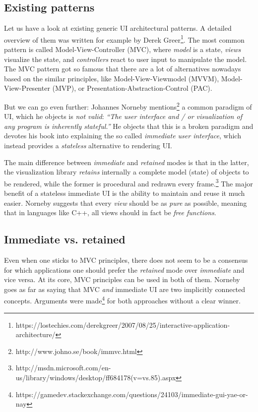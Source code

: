 \subsection{Existing patterns}

Let us have a look at existing generic UI architectural patterns.
A detailed overview of them was written for example by Derek Greer\footnote{https://lostechies.com/derekgreer/2007/08/25/interactive-application-architecture/}.
The most common pattern is called Model-View-Controller (MVC), where \emph{model} is a state, \emph{views} visualize the state, and \emph{controllers} react to user input to manipulate the model.
The MVC pattern got so famous that there are a lot of alternatives nowadays based on the similar principles, like Model-View-Viewmodel (MVVM), Model-View-Presenter (MVP), or Presentation-Abstraction-Control (PAC).

But we can go even further: Johannes Norneby mentions\footnote{http://www.johno.se/book/immvc.html} a common paradigm of UI, which he objects is \emph{not valid}: \emph{``The user interface and / or visualization of any program is inherently stateful.''}
He objects that this is a broken paradigm and devotes his book into explaining the so called \emph{immediate user interface}, which instead provides a \emph{stateless} alternative to rendering UI.

The main difference between \emph{immediate} and \emph{retained} modes is that in the latter, the visualization library \emph{retains} internally a complete model (state) of objects to be rendered, while the former is procedural and redrawn every frame.\footnote{http://msdn.microsoft.com/en-us/library/windows/desktop/ff684178(v=vs.85).aspx}
The major benefit of a stateless immediate UI is the ability to maintain and reuse it much easier.
Norneby suggests that every \emph{view} should be as \emph{pure} as possible, meaning that in languages like C++, all views should in fact be \emph{free functions}.

\subsection{Immediate vs. retained}

Even when one sticks to MVC principles, there does not seem to be a consensus for which applications one should prefer the \emph{retained} mode over \emph{immediate} and vice versa.
At its core, MVC principles can be used in both of them.
Norneby goes as far as saying that MVC \emph{and} immediate UI are two implicitly connected concepts.
Arguments were made\footnote{https://gamedev.stackexchange.com/questions/24103/immediate-gui-yae-or-nay} for both approaches without a clear winner.

